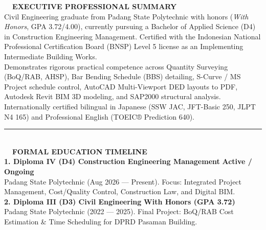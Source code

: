 \documentclass[10pt,a4paper,landscape]{article}
\begin{document}
\noindent
\begin{minipage}[t]{0.58\linewidth}
  \vspace{0pt}
  \begin{tcolorbox}[sharp corners, boxrule=0.8pt, colframe=pborder, colback=white, left=3.5mm, right=3.5mm, top=2.5mm, bottom=2.5mm, height=100mm]
    \colorbox{pred}{\fontsize{7pt}{8pt}\selectfont\bfseries\color{white}\ \ EXECUTIVE PROFESSIONAL SUMMARY\ \ }\\[1.5mm]
    {\fontsize{7.2pt}{9.6pt}\selectfont\color{psteel}Civil Engineering graduate from Padang State Polytechnic with honors (\textit{With Honors}, GPA 3.72/4.00), currently pursuing a Bachelor of Applied Science (D4) in Construction Engineering Management. Certified with the Indonesian National Professional Certification Board (BNSP) Level 5 license as an Implementing Intermediate Building Works.}\\[1.5mm]
    {\fontsize{7.2pt}{9.6pt}\selectfont\color{psteel}Demonstrates rigorous practical competence across Quantity Surveying (BoQ/RAB, AHSP), Bar Bending Schedule (BBS) detailing, S-Curve / MS Project schedule control, AutoCAD Multi-Viewport DED layouts to PDF, Autodesk Revit BIM 3D modeling, and SAP2000 structural analysis. Internationally certified bilingual in Japanese (SSW JAC, JFT-Basic 250, JLPT N4 165) and Professional English (TOEIC® Prediction 640).}\\[2mm]

    \noindent\textcolor{pborder}{\rule{\linewidth}{0.5pt}}\\[1.5mm]

    \colorbox{pnavy}{\fontsize{7pt}{8pt}\selectfont\bfseries\color{white}\ \ FORMAL EDUCATION TIMELINE\ \ }\\[1.5mm]

    {\fontsize{7.8pt}{9.2pt}\selectfont\bfseries\color{pnavy}1. Diploma IV (D4) Construction Engineering Management} \hfill {\fontsize{6.8pt}{8pt}\selectfont\color{pred}\textbf{Active / Ongoing}}\\[0.3mm]
    {\fontsize{6.8pt}{8pt}\selectfont\color{psteel}Padang State Polytechnic (Aug 2026 --- Present). Focus: Integrated Project Management, Cost/Quality Control, Construction Law, and Digital BIM.}\\[1.2mm]

    {\fontsize{7.8pt}{9.2pt}\selectfont\bfseries\color{pnavy}2. Diploma III (D3) Civil Engineering} \hfill {\fontsize{6.8pt}{8pt}\selectfont\color{pred}\textbf{With Honors (GPA 3.72)}}\\[0.3mm]
    {\fontsize{6.8pt}{8pt}\selectfont\color{psteel}Padang State Polytechnic (2022 --- 2025). Final Project: BoQ/RAB Cost Estimation \& Time Scheduling for DPRD Pasaman Building.}\\[1.2mm]


\end{tcolorbox}
\end{minipage}
\end{document}
